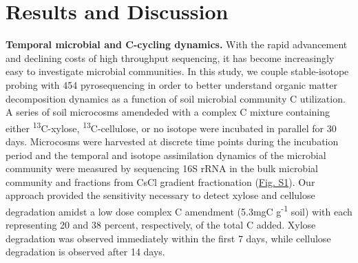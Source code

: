 \section{Results and Discussion}


\textbf{Temporal microbial and C-cycling dynamics.} With the rapid advancement and declining costs of high throughput sequencing, it has become increasingly easy to investigate microbial communities. In this study, we couple stable-isotope probing with 454 pyrosequencing in order to better understand organic matter decomposition dynamics as a function of soil microbial community C utilization. A series of soil microcosms amendeded with a complex C mixture containing either \textsuperscript{13}C-xylose, \textsuperscript{13}C-cellulose, or no isotope were incubated in parallel for 30 days. Microcosms were harvested at discrete time points during the incubation period and the temporal and isotope assimilation dynamics of the microbial community were measured by sequencing 16S rRNA in the bulk microbial community and fractions from CsCl gradient fractionation (\href{https://www.authorea.com/users/3537/articles/8459/master/file/figures/20140708_ConceptualFig2/20140708_ConceptualFig2.pdf}{Fig. S1}). Our approach provided the sensitivity necessary to detect xylose and cellulose degradation amidst a low dose complex C amendment (5.3mgC g\textsuperscript{-1} soil) with each representing 20 and 38 percent, respectively, of the total C added. Xylose degradation was observed immediately within the first 7 days, while cellulose degradation is observed after 14 days. 


